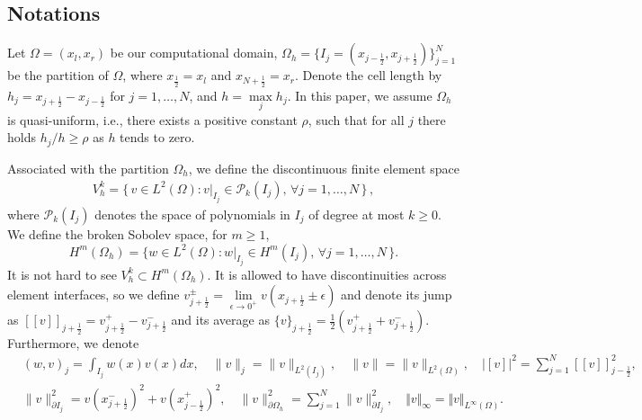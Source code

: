 \documentclass[11pt]{article}
\newcommand{\Ht}{H^{m}(\Omega_h)}
\newcommand{\norm}   [1] {\Vert#1\Vert}
\newcommand{\normb}  [1] {|\![#1]\!|}
\newcommand{\jump}   [1] {[\![#1]\!]}
\newcommand{\jbhalf}{j-\frac12}
\newcommand{\jfhalf}{j+\frac12}
\newcommand{\sumn}{\sum_{j=1}^N}
\numberwithin{equation}{section}
\newcommand{\jl}{j-\frac 12}
\newcommand{\jr}{j+\frac 12}
\begin{document}
\subsection{Notations}\label{sec2:0}
Let $\Omega=(x_l, x_r)$ be our computational domain,
$\Omega_h=\{I_j=(x_{\jbhalf},x_{\jfhalf})\}_{j=1}^N$ be the partition of $\Omega$, where $x_{\frac12}=x_l$ and $x_{N+\frac12}=x_r$. Denote the cell length by $h_j=x_{\jfhalf}-x_{\jbhalf}$ for $j=1,\ldots ,N$, and $h=\max\limits_j h_j$. In this paper, we assume $\Omega_h$ is quasi-uniform, i.e., there exists a positive constant $\rho$, %
such that for all $j$ there holds $h_j/h \ge \rho$  as $h$ tends to zero.
	
Associated with the partition $\Omega_h$, we define the discontinuous finite element space
\begin{align}
V_h^k =\big\{\,v\in L^2(\Omega):v|_{I_j}\in \mathcal{P}_k(I_j),\,\forall j=1,\ldots,N\,\big\}\, ,
\end{align}
where $\mathcal{P}_k(I_j)$ denotes the space of polynomials in $I_j$ of degree at most $k\geq 0$. {We define the broken Sobolev space, for $m\geq 1$, $$\Ht=\big\{w\in L^2(\Omega): w|_{I_j}\in H^m(I_j),\,\forall j=1,\ldots,N\,\big\}.$$}It is not hard to see $V_h^k\subset \Ht$. It is allowed to have discontinuities across element interfaces, so we define $v^{\pm}_{\jr}=\lim\limits_{\epsilon\rightarrow 0^+}v(x_{\jr}\pm\epsilon)$ and denote its jump as  $\jump{v}_{\jr} = v^{+}_{\jr} - v^{-}_{\jr}$ and its average as $\{v\}_{\jr} = \frac 12(v^{+}_{\jr} + v^{-}_{\jr})$. Furthermore, we denote
\begin{align*}
&(w,v)_j=\int_{I_j} w(x)v(x) dx, \quad \|v\|_j=\|v\|_{L^2(I_j)},\quad \|v\|=\|v\|_{L^2(\Omega)},\quad \normb{v}^2=\sumn \jump{v}_{\jbhalf}^2,\\
& \|v\|^2_{\partial I_j}=v(x_{\jr}^-)^2+v(x_{\jl}^+)^2,\quad \|v\|^2_{\partial \Omega_h}=\sum_{j=1}^N\|v\|^2_{\partial I_j}, \quad \norm{v}_{\infty} = \norm{v}_{L^\infty(\Omega)}.
\end{align*}


\end{document}
